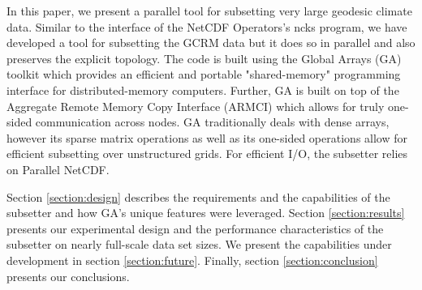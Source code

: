In this paper, we present a parallel tool for subsetting very large geodesic
climate data.  Similar to the interface of the NetCDF Operators's\cite{NCO}
ncks program, we have developed a tool for subsetting the GCRM data but it
does so in parallel and also preserves the explicit topology.  The code is
built using the Global Arrays (GA) toolkit which provides an efficient and
portable "shared-memory" programming interface for distributed-memory
computers.\cite{GA}  Further, GA is built on top of the Aggregate Remote
Memory Copy Interface (ARMCI)\cite{ARMCI} which allows for truly one-sided
communication across nodes.  GA traditionally deals with dense arrays, however
its sparse matrix operations as well as its one-sided operations allow for
efficient subsetting over unstructured grids.  For efficient I/O, the
subsetter relies on Parallel NetCDF.

Section \ref{section:design} describes the requirements and the capabilities
of the subsetter and how GA's unique features were leveraged.  Section
\ref{section:results} presents our experimental design and the performance
characteristics of the subsetter on nearly full-scale data set sizes.  We
present the capabilities under development in section \ref{section:future}.
Finally, section \ref{section:conclusion} presents our conclusions.
